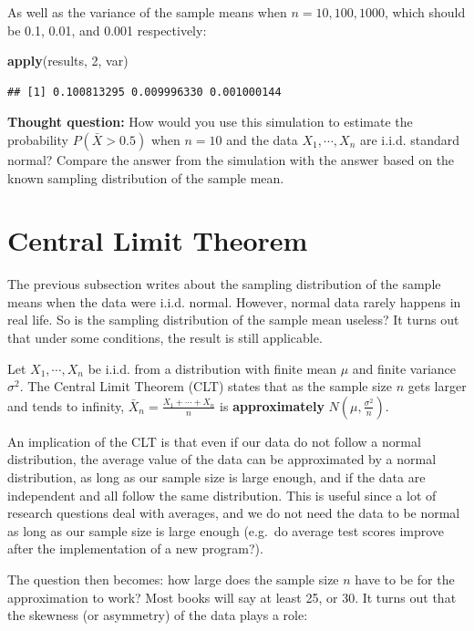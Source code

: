 \documentclass[
]{book}
\newenvironment{Shaded}{\begin{snugshade}}{\end{snugshade}}
\newcommand{\DecValTok}[1]{\textcolor[rgb]{0.00,0.00,0.81}{#1}}
\newcommand{\FunctionTok}[1]{\textcolor[rgb]{0.13,0.29,0.53}{\textbf{#1}}}
\newcommand{\NormalTok}[1]{#1}
\theoremstyle{definition}
\theoremstyle{definition}
\theoremstyle{definition}
\theoremstyle{definition}
\theoremstyle{remark}
\begin{document}
As well as the variance of the sample means when \(n = 10, 100, 1000\), which should be 0.1, 0.01, and 0.001 respectively:

\begin{Shaded}
\begin{Highlighting}[]
\FunctionTok{apply}\NormalTok{(results, }\DecValTok{2}\NormalTok{, var)}
\end{Highlighting}
\end{Shaded}

\begin{verbatim}
## [1] 0.100813295 0.009996330 0.001000144
\end{verbatim}

\textbf{Thought question:} How would you use this simulation to estimate the probability \(P(\bar{X} > 0.5)\) when \(n=10\) and the data \(X_1, \cdots, X_n\) are i.i.d. standard normal? Compare the answer from the simulation with the answer based on the known sampling distribution of the sample mean.

\hypertarget{distsampmean2}{%
\section{Central Limit Theorem}\label{distsampmean2}}

The previous subsection writes about the sampling distribution of the sample means when the data were i.i.d. normal. However, normal data rarely happens in real life. So is the sampling distribution of the sample mean useless? It turns out that under some conditions, the result is still applicable.

Let \(X_1, \cdots, X_n\) be i.i.d. from a distribution with finite mean \(\mu\) and finite variance \(\sigma^2\). The Central Limit Theorem (CLT) states that as the sample size \(n\) gets larger and tends to infinity, \(\bar{X}_n = \frac{X_1 + \cdots + X_n}{n}\) is \textbf{approximately} \(N(\mu, \frac{\sigma^2}{n})\).

An implication of the CLT is that even if our data do not follow a normal distribution, the average value of the data can be approximated by a normal distribution, as long as our sample size is large enough, and if the data are independent and all follow the same distribution. This is useful since a lot of research questions deal with averages, and we do not need the data to be normal as long as our sample size is large enough (e.g.~do average test scores improve after the implementation of a new program?).

The question then becomes: how large does the sample size \(n\) have to be for the approximation to work? Most books will say at least 25, or 30. It turns out that the skewness (or asymmetry) of the data plays a role:
\end{document}
